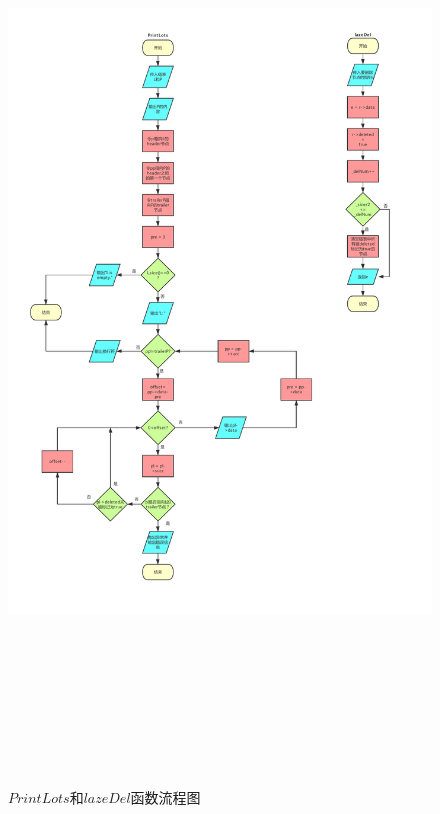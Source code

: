 \documentclass[UTF8]{ctexart}
\begin{document}
\begin{figure}[H]
	\centering 
	\includegraphics[width=20cm, height=25cm]{list_ADT.pdf} 
	\caption{$PrintLots$和$lazeDel$函数流程图} 
	\label{PrintsLots_and_lazeDel}
\end{figure}
\end{document}
